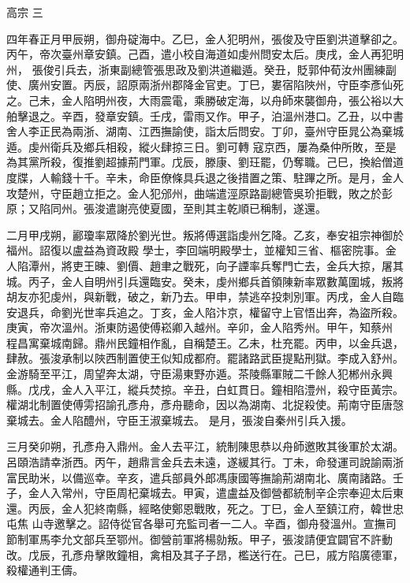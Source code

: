 
\begin{pinyinscope}

 高宗
 三



 四年春正月甲辰朔，御舟碇海中。乙巳，金人犯明州，張俊及守臣劉洪道擊卻之。丙午，帝次臺州章安鎮。己酉，遣小校自海道如虔州問安太后。庚戌，金人再犯明州，
 張俊引兵去，浙東副總管張思政及劉洪道繼遁。癸丑，貶郭仲荀汝州團練副使、廣州安置。丙辰，詔原兩浙州郡降金官吏。丁巳，婁宿陷陜州，守臣李彥仙死之。己未，金人陷明州夜，大雨震電，乘勝破定海，以舟師來襲御舟，張公裕以大舶擊退之。辛酉，發章安鎮。壬戌，雷雨又作。甲子，泊溫州港口。乙丑，以中書舍人李正民為兩浙、湖南、江西撫諭使，詣太后問安。丁卯，臺州守臣晁公為棄城遁。虔州衛兵及鄉兵相殺，縱火肆掠三日。劉可轉
 寇京西，屢為桑仲所敗，至是為其黨所殺，復推劉超據荊門軍。戊辰，滕康、劉玨罷，仍奪職。己巳，換給僧道度牒，人輸錢十千。辛未，命臣僚條具兵退之後措置之策、駐蹕之所。是月，金人攻楚州，守臣趙立拒之。金人犯邠州，曲端遣涇原路副總管吳玠拒戰，敗之於彭原；又陷同州。張浚遣謝亮使夏國，至則其主乾順已稱制，遂還。



 二月甲戌朔，酈瓊率眾降於劉光世。叛將傅選詣虔州乞降。乙亥，奉安祖宗神御於福州。詔復以盧益為資政殿
 學士，李回端明殿學士，並權知三省、樞密院事。金人陷潭州，將吏王暕、劉價、趙聿之戰死，向子諲率兵奪門亡去，金兵大掠，屠其城。丙子，金人自明州引兵還臨安。癸未，虔州鄉兵首領陳新率眾數萬圍城，叛將胡友亦犯虔州，與新戰，破之，新乃去。甲申，禁逃卒投刺別軍。丙戌，金人自臨安退兵，命劉光世率兵追之。丁亥，金人陷汴京，權留守上官悟出奔，為盜所殺。庚寅，帝次溫州。浙東防遏使傅崧卿入越州。辛卯，金人陷秀州。甲午，知蔡州
 程昌寓棄城南歸。鼎州民鐘相作亂，自稱楚王。乙未，杜充罷。丙申，以金兵退，肆赦。張浚承制以陜西制置使王似知成都府。罷諸路武臣提點刑獄。李成入舒州。金游騎至平江，周望奔太湖，守臣湯東野亦遁。茶陵縣軍賊二千餘人犯郴州永興縣。戊戌，金人入平江，縱兵焚掠。辛丑，白虹貫日。鐘相陷澧州，殺守臣黃宗。權湖北制置使傅雱招諭孔彥舟，彥舟聽命，因以為湖南、北捉殺使。荊南守臣唐愨棄城去。金人陷醴州，守臣王淑棄城去。
 是月，張浚自秦州引兵入援。



 三月癸卯朔，孔彥舟入鼎州。金人去平江，統制陳思恭以舟師邀敗其後軍於太湖。呂頤浩請幸浙西。丙午，趙鼎言金兵去未遠，遂緩其行。丁未，命發運司說諭兩浙富民助米，以備巡幸。辛亥，遣兵部員外郎馮康國等撫諭荊湖南北、廣南諸路。壬子，金人入常州，守臣周杞棄城去。甲寅，遣盧益及御營都統制辛企宗奉迎太后東還。丙辰，金人犯終南縣，經略使鄭恩戰敗，死之。丁巳，金人至鎮江府，韓世忠屯焦
 山寺邀擊之。詔侍從官各舉可充監司者一二人。辛酉，御舟發溫州。宣撫司節制軍馬李允文部兵至鄂州。御營前軍將楊勍叛。甲子，張浚請便宜闢官不許動改。戊辰，孔彥舟擊敗鐘相，禽相及其子子昂，檻送行在。己巳，戚方陷廣德軍，殺權通判王儔。




\end{pinyinscope}
